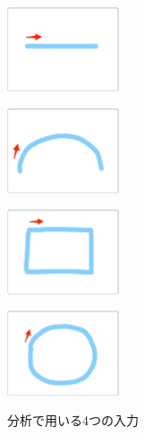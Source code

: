 \documentclass[11pt]{jreport}
\begin{document}
\begin{figure}[H]
    \centering
    \begin{minipage}{0.2\linewidth}
        \centering
        \includegraphics[height=2.5cm]{input1.eps}
        \label{input1}
    \end{minipage}
    \hspace{0.04\columnwidth}
    \begin{minipage}{0.2\linewidth}
        \centering
        \includegraphics[height=2.5cm]{input2.eps}
        \label{input2}
    \end{minipage}
    \hspace{0.04\columnwidth}
    \begin{minipage}{0.2\linewidth}
        \centering
        \includegraphics[height=2.5cm]{input3.eps}
        \label{input3}
    \end{minipage}
    \hspace{0.04\columnwidth}
    \begin{minipage}{0.2\linewidth}
        \centering
        \includegraphics[height=2.5cm]{input4.eps}
        \label{input4}
    \end{minipage}
    \caption{分析で用いる4つの入力}
    \label{analyticsinput}
\end{figure}
\end{document}
